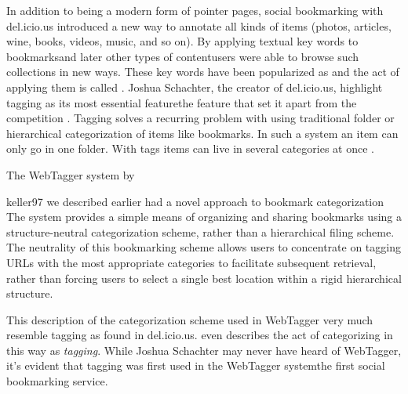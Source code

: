 In addition to being a modern form of pointer pages, social bookmarking
with del.icio.us introduced a new way to annotate all kinds of
items (photos, articles, wine, books, videos, music, and so on).
By applying textual key words to
bookmarks\dash{}and later other types of content\dash{}users were able to
browse such collections in new ways. These key words have been popularized as
 and the act of applying them is called %
.
Joshua Schachter, the creator of del.icio.us, highlight tagging as its most
essential feature\dash{}the feature that set it apart from the competition
\cite[]{livingston07}. Tagging solves a recurring problem with
using traditional folder or hierarchical categorization of items like
bookmarks. In such a system an item can only go in one folder. With
tags items can live in several categories at once
\citep[]{weinberger07}.

The WebTagger system by
\begin{fullquote}[\p{1109}]{keller97}{%
  we described earlier had a novel approach to bookmark categorization}
    The system provides a simple means of organizing and sharing bookmarks
    using a structure-neutral categorization scheme, rather than a
    hierarchical filing scheme. The neutrality of this bookmarking scheme
    allows users to concentrate on tagging URLs with the most appropriate
    categories to facilitate subsequent retrieval, rather than forcing users
    to select a single best location within a rigid hierarchical structure.
\end{fullquote}

This description of the categorization scheme used in WebTagger very much
resemble tagging as found in del.icio.us. \citeauthor{keller97} even describes
the act of categorizing in this way as \emph{tagging}. While Joshua Schachter
may never have heard of WebTagger, it's evident that tagging was first used in
the WebTagger system\dash{}the first social bookmarking service.

